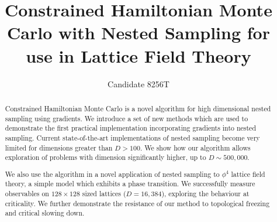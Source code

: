 \documentclass[aps,prd,reprint,preprintnumbers,showpacs,floatfix,nofootinbib,superscript address]{revtex4-2}
\begin{document}
\title{Constrained Hamiltonian Monte Carlo with Nested Sampling for use in Lattice Field Theory}

\author{Candidate 8256T}

\begin{abstract}
     Constrained Hamiltonian Monte Carlo is a novel algorithm for high dimensional nested sampling using gradients.
     We introduce a set of new methods which are used to demonstrate the first
     practical implementation incorporating gradients into nested sampling.
     Current state-of-the-art implementations of nested sampling become very limited for dimensions greater
     than $D > 100$.
     We show how our algorithm allows exploration of problems with dimension significantly higher, up to $D \sim 500,000$.

     We also use the algorithm in a novel application of nested sampling to $\phi^4$ lattice field theory,
     a simple model which exhibits a phase transition.
     We successfully measure observables on $128 \times 128$ sized lattices ($D=16,384$), exploring the behaviour at
     criticality.
     We further demonstrate the resistance of our method to topological freezing and critical slowing down.
\end{abstract}

\maketitle

























\end{document}
